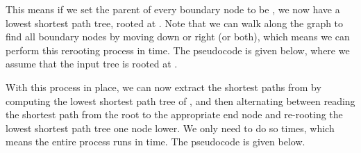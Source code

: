 \documentclass{article}
\begin{document}
This means if we set the parent of every boundary node to be , we now have a lowest shortest path tree, rooted at .  Note that we can walk along the graph to find all boundary nodes by moving down or right (or both), which means we can perform this rerooting process in  time.  The pseudocode is given below, where we assume that the input tree is rooted at .


With this process in place, we can now extract the  shortest paths from  by computing the lowest shortest path tree of , and then alternating between reading the shortest path from the root to the appropriate end node and re-rooting the lowest shortest path tree one node lower.  We only need to do so  times, which means the entire process runs in  time.  The pseudocode is given below.

\end{document}

